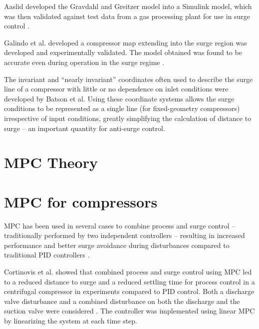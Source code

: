 Aaslid developed the Gravdahl and Greitzer model into a Simulink model, which was then validated against test data from a gas processing plant for use in surge control \cite{Aaslid2009}. 

Galindo et al. developed a compressor map extending into the surge region was developed and experimentally validated. The model obtained was found to be accurate even during operation in the surge regime \cite{Galindo2008}.

The invariant and ``nearly invariant'' coordinates often used to describe the surge line of a compressor with little or no dependence on inlet conditions were developed by Batson et al. \cite{Batson1996}
Using these coordinate systems allows the surge conditions to be represented as a single line (for fixed-geometry compressors) irrespective of input conditions, greatly simplifying the calculation of distance to surge -- an important quantity for anti-surge control.


\section{MPC Theory}

\section{MPC for compressors}
MPC has been used in several cases to combine process and surge control -- traditionally performed by two independent controllers -- resulting in increased performance and better surge avoidance during disturbances compared to traditional PID controllers \cite{Cortinovis2015,Budinis2015}.

Cortinovis et al. showed that combined process and surge control using MPC led to a reduced distance to surge and a reduced settling time for process control in a centrifugal compressor in experiments compared to PID control. 
Both a discharge valve disturbance and a combined disturbance on both the discharge and the suction valve were considered \cite{Cortinovis2015}. 
The controller was implemented using linear MPC by linearizing the system at each time step. 

